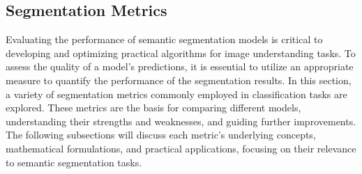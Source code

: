 \subsection{Segmentation Metrics}
\label{subsec:segmentation_metrics}
Evaluating the performance of semantic segmentation models is critical to developing and optimizing practical algorithms for image understanding tasks. To assess the quality of a model's predictions, it is essential to utilize an appropriate measure to quantify the performance of the segmentation results. In this section, a variety of segmentation metrics commonly employed in classification tasks are explored. These metrics are the basis for comparing different models, understanding their strengths and weaknesses, and guiding further improvements. The following subsections will discuss each metric's underlying concepts, mathematical formulations, and practical applications, focusing on their relevance to semantic segmentation tasks.
